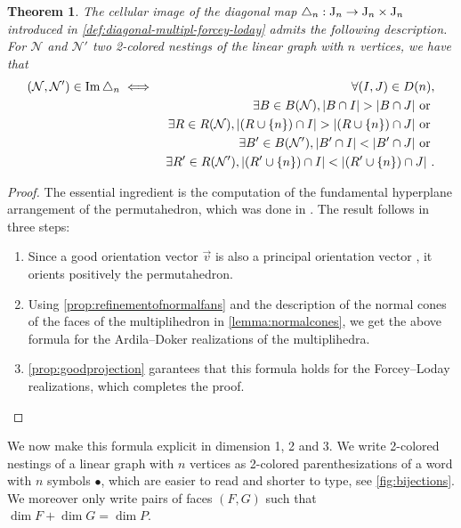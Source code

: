 \documentclass[twoside, 11pt]{amsart}
\newtheorem{theorem}{Theorem}
\theoremstyle{remark}
\begin{document}
\begin{samepage}
\begin{theorem}
\label{thm:formuladiagonal}
The cellular image of the diagonal map $\triangle_n : \mathrm{J}_n \to \mathrm{J}_n \times \mathrm{J}_n$ introduced in \cref{def:diagonal-multipl-forcey-loday} admits the following description.
For $\mathcal{N}$ and $\mathcal{N}'$ two 2-colored nestings of the linear graph with $n$ vertices, we have that
\begin{eqnarray*}
  (\mathcal{N},\mathcal{N}') \in \Ima\triangle_n 
  & \iff & \forall (I,J) \in D(n), \\
  && \exists B \in B(\mathcal{N}), |B\cap I|>|B\cap J| \text{ or }  \\
  && \exists R \in R(\mathcal{N}), |(R\cup \{n\}) \cap I|>| (R\cup \{n\}) \cap J| \text{ or }  \\
  && \exists B' \in B(\mathcal{N}'), |B'\cap I|<|B'\cap J| \text{ or } \nonumber \\
  && \exists R' \in R(\mathcal{N}'), |(R'\cup \{n\}) \cap I|<| (R'\cup \{n\}) \cap J| \ .
\end{eqnarray*}
\end{theorem}
\end{samepage}

\begin{proof} 
The essential ingredient is the computation of the fundamental hyperplane arrangement of the permutahedron, which was done in \cite[Section 3.1]{LA21}. The result follows in three steps:
\begin{enumerate}[leftmargin=*]
\item Since a good orientation vector $\vec v$ is also a principal orientation vector \cite[Definition 3.15]{LA21}, it orients positively the permutahedron. 
\item Using \cref{prop:refinementofnormalfans} and the description of the normal cones of the faces of the multiplihedron in \cref{lemma:normalcones}, we get the above formula for the Ardila--Doker realizations of the multiplihedra. 
\item \cref{prop:goodprojection} garantees that this formula holds for the Forcey--Loday realizations, which completes the proof.
\end{enumerate}
\end{proof}

We now make this formula explicit in dimension 1, 2 and 3. 
We write 2-colored nestings of a linear graph with $n$ vertices as 2-colored parenthesizations of a word with $n$ symbols $\bullet$, which are easier to read and shorter to type, see \cref{fig:bijections}. 
We moreover only write pairs of faces $(F,G)$ such that $\dim F + \dim G = \dim P$.
\end{document}
